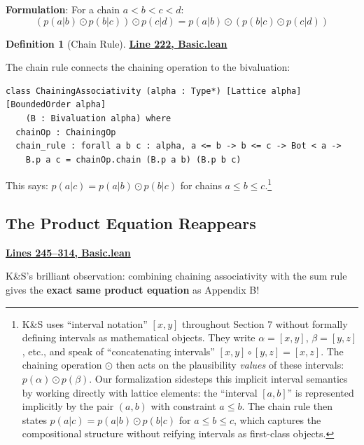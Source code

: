 \documentclass[11pt]{article}
\theoremstyle{definition}
\newtheorem{definition}[theorem]{Definition}
\theoremstyle{remark}
\begin{document}
\textbf{Formulation}: For a chain $a < b < c < d$:
\[ (p(a|b) \odot p(b|c)) \odot p(c|d) = p(a|b) \odot (p(b|c) \odot p(c|d)) \]

\begin{definition}[Chain Rule]
\textbf{\href{https://github.com/zariuq/ks-foundations-of-inference/blob/main/KnuthSkilling/Probability/ConditionalProbability/Basic.lean\#L222}{Line 222, Basic.lean}}

The chain rule connects the chaining operation to the bivaluation:
\end{definition}

\begin{lstlisting}[caption={\texttt{ChainingAssociativity} class (\href{https://github.com/zariuq/ks-foundations-of-inference/blob/main/KnuthSkilling/Probability/ConditionalProbability/Basic.lean\#L222}{Basic.lean:222})},numbers=none]
class ChainingAssociativity (alpha : Type*) [Lattice alpha] [BoundedOrder alpha]
    (B : Bivaluation alpha) where
  chainOp : ChainingOp
  chain_rule : forall a b c : alpha, a <= b -> b <= c -> Bot < a ->
    B.p a c = chainOp.chain (B.p a b) (B.p b c)
\end{lstlisting}

This says: $p(a|c) = p(a|b) \odot p(b|c)$ for chains $a \leq b \leq c$.\footnote{K\&S uses ``interval notation'' $[x,y]$ throughout Section 7 without formally defining intervals as mathematical objects. They write $\alpha = [x,y]$, $\beta = [y,z]$, etc., and speak of ``concatenating intervals'' $[x,y] \circ [y,z] = [x,z]$. The chaining operation $\odot$ then acts on the plausibility \emph{values} of these intervals: $p(\alpha) \odot p(\beta)$. Our formalization sidesteps this implicit interval semantics by working directly with lattice elements: the ``interval $[a,b]$'' is represented implicitly by the pair $(a, b)$ with constraint $a \leq b$. The chain rule then states $p(a|c) = p(a|b) \odot p(b|c)$ for $a \leq b \leq c$, which captures the compositional structure without reifying intervals as first-class objects.}

\subsection{The Product Equation Reappears}

\textbf{\href{https://github.com/zariuq/ks-foundations-of-inference/blob/main/KnuthSkilling/Probability/ConditionalProbability/Basic.lean\#L245-L314}{Lines 245--314, Basic.lean}}

K\&S's brilliant observation: combining chaining associativity with the sum rule gives the \textbf{exact same product equation} as Appendix B!
\end{document}
